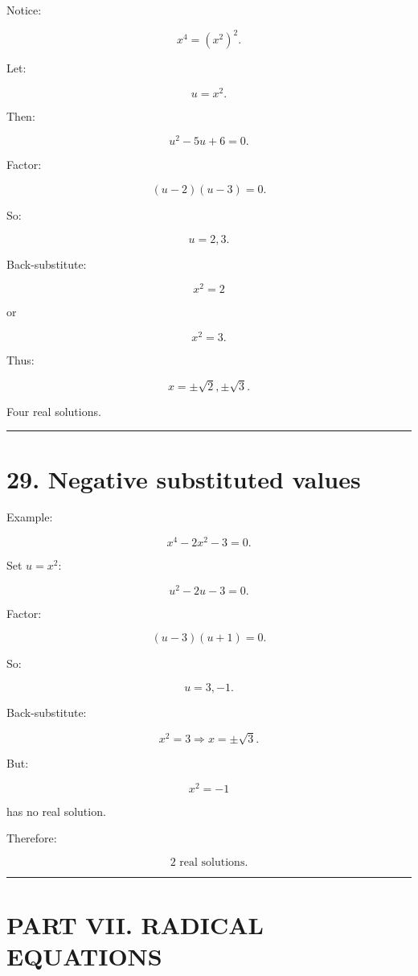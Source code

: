 \documentclass[
]{article}
\begin{document}
Notice:

\[
x^4=(x^2)^2.
\]

Let:

\[
u=x^2.
\]

Then:

\[
u^2-5u+6=0.
\]

Factor:

\[
(u-2)(u-3)=0.
\]

So:

\[
u=2,3.
\]

Back-substitute:

\[
x^2=2
\]

or

\[
x^2=3.
\]

Thus:

\[
\boxed{x=\pm\sqrt2,\pm\sqrt3}.
\]

Four real solutions.

\begin{center}\rule{0.5\linewidth}{0.5pt}\end{center}

\section{29. Negative substituted
values}\label{negative-substituted-values}

Example:

\[
x^4-2x^2-3=0.
\]

Set \(u=x^2\):

\[
u^2-2u-3=0.
\]

Factor:

\[
(u-3)(u+1)=0.
\]

So:

\[
u=3,-1.
\]

Back-substitute:

\[
x^2=3 \Rightarrow x=\pm\sqrt3.
\]

But:

\[
x^2=-1
\]

has no real solution.

Therefore:

\[
\boxed{2\text{ real solutions}}.
\]

\begin{center}\rule{0.5\linewidth}{0.5pt}\end{center}

\section{PART VII. RADICAL EQUATIONS}\label{part-vii.-radical-equations}
\end{document}
